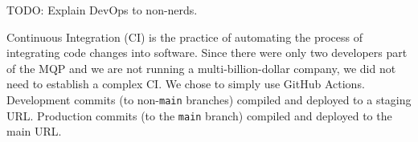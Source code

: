 TODO: Explain DevOps to non-nerds.


    Continuous Integration (CI) is the practice of automating the process of integrating code changes into software.
    Since there were only two developers part of the MQP and we are not running a multi-billion-dollar company, we did not need to establish a complex CI.
    We chose to simply use GitHub Actions.
    Development commits (to non-\texttt{main} branches) compiled and deployed to a staging URL.
    Production commits (to the \texttt{main} branch) compiled and deployed to the main URL.
